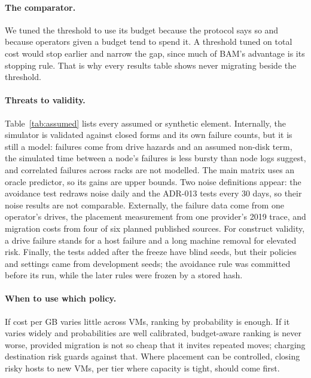 \documentclass[pdflatex,sn-mathphys-num,iicol]{sn-jnl}
\theoremstyle{thmstyleone}%
\theoremstyle{thmstylethree}%
\begin{document}
\paragraph{The comparator.} We tuned the threshold to use its budget because the protocol says so
and because operators given a budget tend to spend it. A threshold tuned on total cost would stop
earlier and narrow the gap, since much of BAM's advantage is its stopping rule. That is why every
results table shows never migrating beside the threshold.

\paragraph{Threats to validity.} Table~\ref{tab:assumed} lists every assumed or synthetic element.
Internally, the simulator is validated against closed forms and its own failure counts, but it is
still a model: failures come from drive hazards and an assumed non-disk term, the simulated time
between a node's failures is less bursty than node logs suggest, and correlated failures across
racks are not modelled. The main matrix uses an oracle predictor, so its gains are upper bounds.
Two noise definitions appear: the avoidance test redraws noise daily and the ADR-013 tests every 30
days, so their noise results are not comparable. Externally, the failure data come from one
operator's drives, the placement measurement from one provider's 2019 trace, and migration costs
from four of six planned published sources. For construct validity, a drive failure stands for a
host failure and a long machine removal for elevated risk. Finally, the tests added after the
freeze have blind seeds, but their policies and settings came from development seeds; the
avoidance rule was committed before its run, while the later rules were frozen by a stored hash.



\paragraph{When to use which policy.} If cost per GB varies little across VMs, ranking by
probability is enough. If it varies widely and probabilities are well calibrated, budget-aware
ranking is never worse, provided migration is not so cheap that it invites repeated moves; charging
destination risk guards against that. Where placement can be controlled, closing risky hosts to new
VMs, per tier where capacity is tight, should come first.

\end{document}
